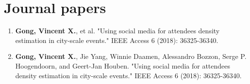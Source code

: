 \section*{Journal papers}

\begin{enumerate}
    \item \textbf{Gong, Vincent X.}, et al. "Using social media for attendees density estimation in city-scale events." IEEE Access 6 (2018): 36325-36340.
    \item \textbf{Gong, Vincent X.}, Jie Yang, Winnie Daamen, Alessandro Bozzon, Serge P. Hoogendoorn, and Geert-Jan Houben. "Using social media for attendees density estimation in city-scale events." IEEE Access 6 (2018): 36325-36340.
    
    
    
\end{enumerate}



